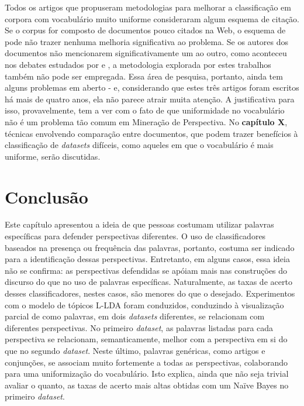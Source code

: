 Todos os artigos que propuseram metodologias para melhorar a classificação em corpora com vocabulário muito uniforme consideraram algum esquema de citação. Se o corpus for composto de documentos pouco citados na Web, o esquema de \cite{efron} pode não trazer nenhuma melhoria significativa ao problema. Se os autores dos documentos não mencionarem significativamente um ao outro, como aconteceu nos debates estudados por \cite{aaai-politics} e \cite{malouf-taking_sides}, a metodologia explorada por estes trabalhos também não pode ser empregada. Essa área de pesquisa, portanto, ainda tem alguns problemas em aberto - e, considerando que estes três artigos foram escritos há mais de quatro anos, ela não parece atrair muita atenção. A justificativa para isso, provavelmente, tem a ver com o fato de que uniformidade no vocabulário não é um problema tão comum em Mineração de Perspectiva. No \textbf{capítulo X}, técnicas envolvendo comparação entre documentos, que podem trazer benefícios à classificação de \emph{datasets} difíceis, como aqueles em que o vocabulário é mais uniforme, serão discutidas.

\section{Conclusão}

Este capítulo apresentou a ideia de que pessoas costumam utilizar palavras específicas para defender perspectivas diferentes. O uso de classificadores baseados na presença ou frequência das palavras, portanto, costuma ser indicado para a identificação dessas perspectivas. Entretanto, em alguns casos, essa ideia não se confirma: as perspectivas defendidas se apóiam mais nas construções do discurso do que no uso de palavras específicas. Naturalmente, as taxas de acerto desses classificadores, nestes casos, são menores do que o desejado. Experimentos com o modelo de tópicos L-LDA foram conduzidos, conduzindo à visualização parcial de como palavras, em dois \emph{datasets} diferentes, se relacionam com diferentes perspectivas. No primeiro \emph{dataset}, as palavras listadas para cada perspectiva se relacionam, semanticamente, melhor com a perspectiva em si do que no segundo \emph{dataset}. Neste último, palavras genéricas, como artigos e conjunções, se associam muito fortemente a todas as perspectivas, colaborando para uma uniformização do vocabulário. Isto explica, ainda que não seja trivial avaliar o quanto, as taxas de acerto mais altas obtidas com um Naïve Bayes no primeiro \emph{dataset}.

